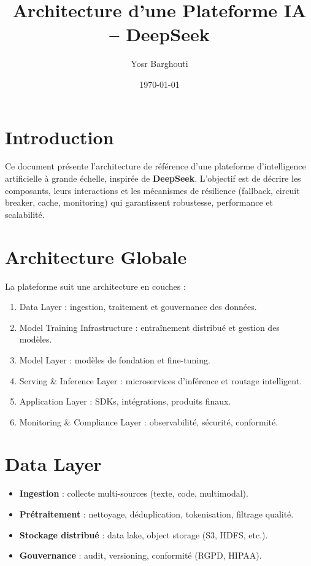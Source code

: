 \documentclass[12pt,a4paper]{report}
\title{Architecture d'une Plateforme IA -- DeepSeek}
\author{Yosr Barghouti}
\date{\today}
\begin{document}
\maketitle
\tableofcontents
\newpage

\chapter{Introduction}
Ce document présente l’architecture de référence d’une plateforme d’intelligence artificielle à grande échelle, inspirée de \textbf{DeepSeek}.  
L’objectif est de décrire les composants, leurs interactions et les mécanismes de résilience (fallback, circuit breaker, cache, monitoring) qui garantissent robustesse, performance et scalabilité.

\chapter{Architecture Globale}
La plateforme suit une architecture en couches :
\begin{enumerate}
    \item Data Layer : ingestion, traitement et gouvernance des données.  
    \item Model Training Infrastructure : entraînement distribué et gestion des modèles.  
    \item Model Layer : modèles de fondation et fine-tuning.  
    \item Serving \& Inference Layer : microservices d’inférence et routage intelligent.  
    \item Application Layer : SDKs, intégrations, produits finaux.  
    \item Monitoring \& Compliance Layer : observabilité, sécurité, conformité.  
\end{enumerate}

\chapter{Data Layer}
\begin{itemize}
    \item \textbf{Ingestion} : collecte multi-sources (texte, code, multimodal).  
    \item \textbf{Prétraitement} : nettoyage, déduplication, tokenisation, filtrage qualité.  
    \item \textbf{Stockage distribué} : data lake, object storage (S3, HDFS, etc.).  
    \item \textbf{Gouvernance} : audit, versioning, conformité (RGPD, HIPAA).  
\end{itemize}
\end{document}
